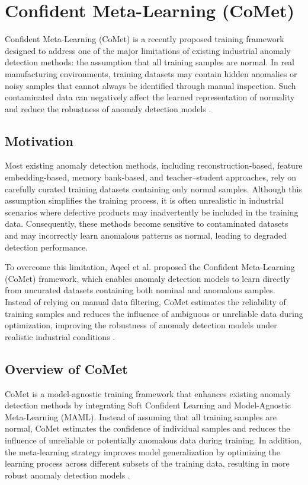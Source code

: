 \documentclass[12pt,openany,oneside]{book}
\begin{document}
\section{Confident Meta-Learning (CoMet)}

Confident Meta-Learning (CoMet) is a recently proposed training framework designed to address one of the major limitations of existing industrial anomaly detection methods: the assumption that all training samples are normal. In real manufacturing environments, training datasets may contain hidden anomalies or noisy samples that cannot always be identified through manual inspection. Such contaminated data can negatively affect the learned representation of normality and reduce the robustness of anomaly detection models \cite{aqeel2025comet}.

\subsection{Motivation}

Most existing anomaly detection methods, including reconstruction-based, feature embedding-based, memory bank-based, and teacher--student approaches, rely on carefully curated training datasets containing only normal samples. Although this assumption simplifies the training process, it is often unrealistic in industrial scenarios where defective products may inadvertently be included in the training data. Consequently, these methods become sensitive to contaminated datasets and may incorrectly learn anomalous patterns as normal, leading to degraded detection performance.

To overcome this limitation, Aqeel et al. proposed the Confident Meta-Learning (CoMet) framework, which enables anomaly detection models to learn directly from uncurated datasets containing both nominal and anomalous samples. Instead of relying on manual data filtering, CoMet estimates the reliability of training samples and reduces the influence of ambiguous or unreliable data during optimization, improving the robustness of anomaly detection models under realistic industrial conditions \cite{aqeel2025comet}.

\subsection{Overview of CoMet}

CoMet is a model-agnostic training framework that enhances existing anomaly detection methods by integrating Soft Confident Learning and Model-Agnostic Meta-Learning (MAML). Instead of assuming that all training samples are normal, CoMet estimates the confidence of individual samples and reduces the influence of unreliable or potentially anomalous data during training. In addition, the meta-learning strategy improves model generalization by optimizing the learning process across different subsets of the training data, resulting in more robust anomaly detection models \cite{aqeel2025comet}.
\end{document}
